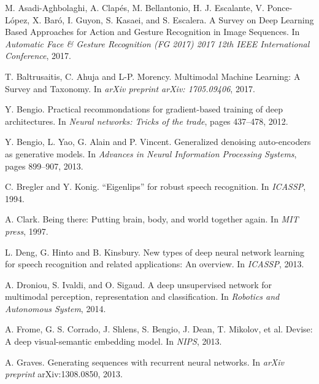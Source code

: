 

\newpage

\begin{thebibliography}{99}

  M. Asadi-Aghbolaghi, A. Clapés, M. Bellantonio, H. J. Escalante, 
  V. Ponce-López, X. Baró, I. Guyon, S. Kasaei, and S. Escalera. 
  A Survey on Deep Learning Based Approaches for Action and Gesture 
  Recognition in Image Sequences. 
  In \textit{Automatic Face \& Gesture Recognition (FG 2017) 2017 12th IEEE
  International Conference}, 2017.

  T. Baltrusaitis, C. Ahuja and L-P. Morency. Multimodal Machine Learning:
  A Survey and Taxonomy. In \textit{arXiv preprint arXiv: 1705.09406}, 2017.

  Y. Bengio. Practical recommondations for gradient-based training of deep
  architectures. In \textit{Neural networks: Tricks of the trade},
  pages 437--478, 2012.

  Y. Bengio, L. Yao, G. Alain and P. Vincent. Generalized denoising
  auto-encoders as generative models. In \textit{Advances in Neural
  Information Processing Systems}, pages 899--907, 2013.

  C. Bregler and Y. Konig. ``Eigenlips'' for robust speech recognition.
  In \textit{ICASSP}, 1994.

  A. Clark. Being there: Putting brain, body, and world together again.
  In \textit{MIT press}, 1997.

  L. Deng, G. Hinto and B. Kinsbury. New types of deep neural network
  learning for speech recognition and related applications: An overview.
  In \textit{ICASSP}, 2013.

  A. Droniou, S. Ivaldi, and O. Sigaud. A deep unsupervised network
  for multimodal perception, representation and classification. In
  \textit{Robotics and Autonomous System}, 2014.

  A. Frome, G. S. Corrado, J. Shlens, S. Bengio, J. Dean,
  T. Mikolov, et al. Devise: A deep visual-semantic embedding model. 
  In \textit{NIPS}, 2013.

  A. Graves. Generating sequences with recurrent neural networks.
  In \textit{arXiv preprint} arXiv:1308.0850, 2013.


\end{thebibliography}
